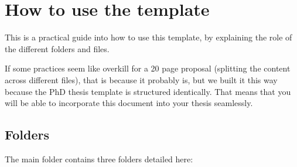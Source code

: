 \chapter{How to use the template} \label{ch-2}

This is a practical guide into how to use this template, by explaining the role of the different folders and files.

If some practices seem like overkill for a 20 page proposal (splitting the content across different files), that is because it probably is, but we built it this way because the PhD thesis template is structured identically. That means that you will be able to incorporate this document into your thesis seamlessly.

\section{Folders}

The main folder contains three folders detailed here:

